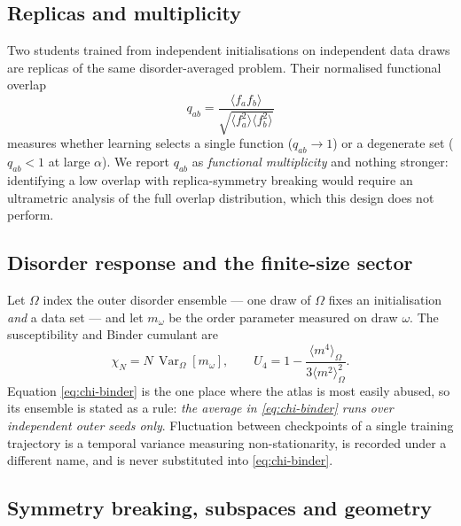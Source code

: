 \subsection{Replicas and multiplicity}

Two students trained from independent initialisations on independent data draws
are replicas of the same disorder-averaged problem. Their normalised functional
overlap
\begin{equation}
  q_{ab}=\frac{\langle f_a f_b\rangle}
              {\sqrt{\langle f_a^2\rangle\langle f_b^2\rangle}}
  \label{eq:qab}
\end{equation}
measures whether learning selects a single function ($q_{ab}\to1$) or a
degenerate set ($q_{ab}<1$ at large $\alpha$). We report $q_{ab}$ as
\emph{functional multiplicity} and nothing stronger: identifying a low overlap
with replica-symmetry breaking would require an ultrametric analysis of the
full overlap distribution, which this design does not perform.

\subsection{Disorder response and the finite-size sector}

Let $\Omega$ index the outer disorder ensemble --- one draw of
$\Omega$ fixes an initialisation \emph{and} a data set --- and let $m_\omega$
be the order parameter measured on draw $\omega$. The susceptibility and Binder
cumulant are
\begin{equation}
  \chi_N = N\,\operatorname{Var}_\Omega\!\left[m_\omega\right],
  \qquad
  U_4 = 1-\frac{\langle m^4\rangle_\Omega}{3\langle m^2\rangle_\Omega^2}.
  \label{eq:chi-binder}
\end{equation}
Equation \eqref{eq:chi-binder} is the one place where the atlas is most easily
abused, so its ensemble is stated as a rule: \emph{the average in
\eqref{eq:chi-binder} runs over independent outer seeds only}. Fluctuation
between checkpoints of a single training trajectory is a temporal variance
measuring non-stationarity, is recorded under a different name, and is never
substituted into \eqref{eq:chi-binder}.

\subsection{Symmetry breaking, subspaces and geometry}

